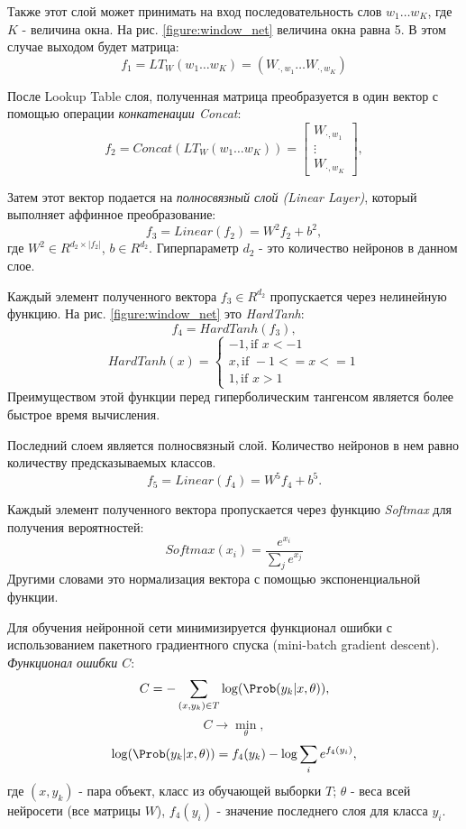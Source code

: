   Также этот слой может принимать на вход последовательность слов $w_1 \ldots w_K$,
  где $K$ - величина окна. На рис. \ref{figure:window_net} величина окна равна 5.
  В этом случае выходом будет матрица:
  \[
    f_1 = LT_W(w_1 \ldots w_K) = ( W_{\cdot, w_1} \ldots W_{\cdot, w_K})
  \]

  После Lookup Table слоя, полученная матрица преобразуется в один вектор с
  помощью операции \textit{конкатенации Concat}:
  \[
    f_{2} = Concat(LT_W(w_1 \ldots w_K)) =
      \begin{bmatrix}
        W_{\cdot, w_1} \\
        \vdots \\
        W_{\cdot, w_K}
      \end{bmatrix},
  \]

  Затем этот вектор подается на \textit{полносвязный слой (Linear Layer)}, который
  выполняет аффинное преобразование:
  \begin{equation} \label{formula:linear_layer}
    f_{3} = Linear(f_{2}) = W^2 f_{2} + b^2,
  \end{equation}
  где $W^2 \in R^{d_{2} \times |f_{2}|}$, $b \in R^{d_2}$. Гиперпараметр $d_{2}$ -
  это количество нейронов в данном слое.

  Каждый элемент полученного вектора $f_3 \in R^{d_2}$ пропускается через нелинейную функцию.
  На рис. \ref{figure:window_net} это \textit{HardTanh}:
  \[
    f_{4} = HardTanh(f_{3}),
  \]
  \begin{equation} \label{formula:hard_tanh}
  HardTanh(x) =
    \begin{cases}
      -1, \text{if } x < -1 \\
      x, \text{if } -1 <= x <= 1 \\
      1, \text{if } x > 1
    \end{cases}
  \end{equation}
  Преимуществом этой функции перед гиперболическим тангенсом является более быстрое
  время вычисления.

  Последний слоем является полносвязный слой. Количество нейронов в нем
  равно количеству предсказываемых классов.
  \[
    f_5 = Linear(f_4) = W^5 f_{4} + b^5.
  \]

  Каждый элемент полученного вектора пропускается через функцию \textit{Softmax} для получения
  вероятностей:
  \[
    Softmax(x_{i}) = \frac{e^{x_{i}}}{\sum_j e^{x_{j}}}
  \]
  Другими словами это нормализация вектора с помощью экспоненциальной функции.

  Для обучения нейронной сети минимизируется функционал ошибки с использованием
  пакетного градиентного спуска (mini-batch gradient descent).
  \textit{Функционал ошибки $C$}:
  \[
    C = - \sum_{(x, y_k) \in T} \log(\Prob(y_k | x, \theta)),
  \]
  \[
    C \rightarrow \min_\theta,
  \]
  \[
    \log(\Prob(y_k | x, \theta)) = f_4(y_k) - \log\sum_i e^{f_4(y_i)},
  \]
  где $(x, y_k)$ - пара объект, класс из обучающей выборки $T$; $\theta$ - веса
  всей нейросети (все матрицы $W$), $f_4(y_i)$ - значение последнего слоя для класса $y_i$.

